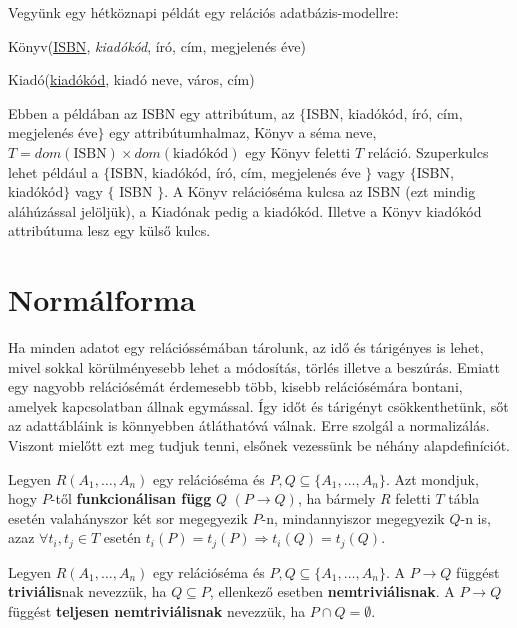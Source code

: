 \begin{pld}
Vegyünk egy hétköznapi példát egy relációs adatbázis-modellre:\par

    Könyv(\underline{ISBN}, \textit{kiadókód}, író, cím, megjelenés éve)\par
    Kiadó(\underline{kiadókód}, kiadó neve, város, cím)\par

Ebben a példában az ISBN egy attribútum, az $\{$ISBN, kiadókód, író, cím, megjelenés éve$\}$  egy attribútumhalmaz, Könyv a séma neve, $T = dom(\text{ISBN}) \times dom(\text{kiadókód})$ egy Könyv feletti $T$ reláció.
Szuperkulcs lehet például a $\{$ISBN, kiadókód, író, cím, megjelenés éve $\}$ vagy $\{$ISBN, kiadókód$\}$ vagy $\{$ ISBN $\}$. A Könyv relációséma kulcsa az ISBN (ezt mindig aláhúzással jelöljük), a Kiadónak pedig a kiadókód. Illetve a Könyv kiadókód attribútuma lesz egy külső kulcs.
\end{pld}

\section{Normálforma}

Ha minden adatot egy relációssémában tárolunk, az idő és tárigényes is lehet, mivel sokkal körülményesebb lehet a módosítás, törlés illetve a beszúrás. Emiatt egy nagyobb relációsémát érdemesebb több, kisebb relációsémára bontani, amelyek kapcsolatban állnak egymással. Így időt és tárigényt csökkenthetünk, sőt az adattábláink is könnyebben átláthatóvá válnak. Erre szolgál a normalizálás. Viszont mielőtt ezt meg tudjuk tenni, elsőnek vezessünk be néhány alapdefiníciót.

\begin{defi} 
Legyen $R(A_1,\ldots,A_n)$ egy relációséma és $P,Q \subseteq \{A_1,\ldots,A_n\}$. Azt mondjuk, hogy $P$-től \textbf{funkcionálisan függ} $Q$ $(P \rightarrow Q)$, ha bármely $R$ feletti $T$ tábla esetén valahányszor két sor megegyezik $P$-n, mindannyiszor megegyezik $Q$-n is, azaz 
$\forall t_i, t_j \in T$ esetén $ t_i(P) = t_j(P) \Rightarrow t_i(Q) = t_j(Q)$. 
\end{defi}

\begin{defi} \hfill \break
Legyen $R(A_1,\ldots,A_n)$ egy relációséma és $P,Q \subseteq \{A_1,\ldots,A_n\}$. A $P \longrightarrow Q$ függést \textbf{triviális}nak nevezzük, ha $Q \subseteq P$, ellenkező esetben \textbf{nemtriviálisnak}. A $P \longrightarrow Q$ függést \textbf{teljesen nemtriviálisnak} nevezzük, ha $P \cap Q = \emptyset$.
\end{defi}

